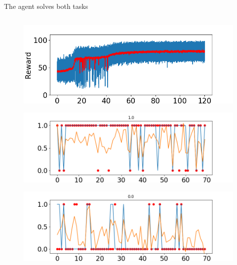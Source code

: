 \documentclass[14pt]{beamer}
\begin{document}
\begin{frame}{The agent solves both tasks}

\begin{columns}

\begin{column}{0.5\textwidth}
  \begin{figure}[htb]
    \includegraphics[width=\textwidth]{images/ptask/total_rew}
  \end{figure}
  \vspace{-0.5cm}
  \begin{figure}[htb]
    \includegraphics[width=\textwidth]{images/ptask/episode4}
  \end{figure}
  \vspace{-1cm}
  \begin{figure}[htb]
    \includegraphics[width=\textwidth]{images/ptask/episode2}
  \end{figure}
\end{column}


\end{columns}
\end{frame}
\end{document}
